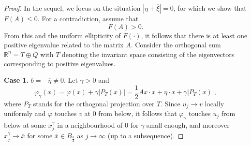 \documentclass[11pt,reqno]{amsart}
\numberwithin{equation}{section}
\begin{document}
\begin{proof}
In the sequel, we focus on the situation $|\eta+\overline{\xi}|=0$, for which we show that $F(A)\le0$.
For a contradiction, assume that
\begin{equation}
\label{4-1-7}
F(A)>0.
\end{equation}
From this and the uniform ellipticity of $F(\cdot)$, it follows that there is at least one positive eigenvalue related to the matrix $A$.
Consider the orthogonal sum $\mathbb{R}^n=T\oplus Q$ with $T$ %
denoting the invariant space consisting of the eigenvectors corresponding to positive eigenvalues.

\medskip

\textbf{Case 1.} $b=-\overline{\eta}\neq0$. Let $\gamma>0$ and
$$
\varphi_\gamma(x)=\varphi(x)+\gamma|P_T(x)|=\frac{1}{2}Ax\cdot x+\eta\cdot x+\gamma|P_T(x)|,
$$
where $P_T$ stands for the orthogonal projection over $T$.
Since $u_j\rightarrow v$ locally uniformly and $\varphi$ touches $v$ at 0 from below, it follows that $\varphi_\gamma$ touches $u_j$ from below at some $x^\gamma_j$ in a neighbourhood of 0 for $\gamma$ small enough, and moreover $x^\gamma_j\rightarrow\overline{x}$ for some $\overline{x}\in B_{\frac34}$ as $j\rightarrow\infty$ (up to a subsequence).


\end{proof}
\end{document}
